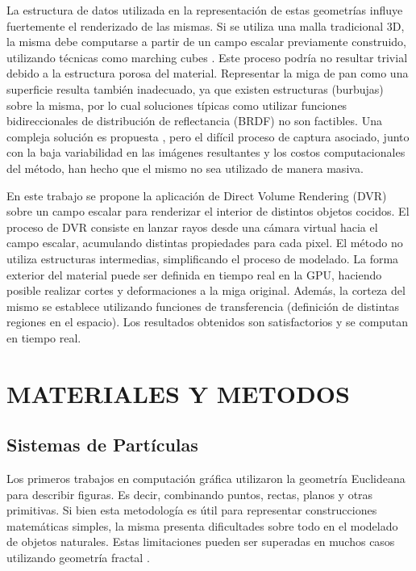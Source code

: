 \documentclass[oneside,a4paper,spanish,links]{amca}
\begin{document}
La estructura de datos utilizada en la representaci\'on de estas geometr\'ias influye fuertemente el renderizado de las mismas. Si se utiliza una malla tradicional 3D, la misma debe computarse a partir de un campo escalar previamente construido, utilizando t\'ecnicas como 
marching cubes \citep{Lorensen1987}. Este proceso podr\'ia no resultar trivial debido a la estructura porosa del material. Representar la miga de pan como una superficie resulta tambi\'en inadecuado, ya que existen estructuras (burbujas) sobre la misma, por lo cual soluciones t\'ipicas como utilizar funciones bidireccionales de distribuci\'on de reflectancia (BRDF) \citep{Kurt2009} no son factibles. Una compleja soluci\'on es propuesta \citep{Tong2005}, pero el dif\'icil proceso de captura asociado, junto con la baja variabilidad en las im\'agenes resultantes y los costos computacionales del m\'etodo, han hecho que el mismo no sea utilizado de manera masiva. 

En este trabajo se propone la aplicaci\'on de Direct Volume Rendering (DVR) \citep{Levoy1988, Kratz2006} sobre un campo escalar para renderizar el interior de distintos objetos cocidos. El proceso de DVR consiste en lanzar rayos desde una c\'amara virtual hacia el campo escalar, acumulando distintas propiedades para cada pixel. El m\'etodo no utiliza estructuras intermedias, simplificando el proceso de modelado. La forma exterior del material puede ser definida en tiempo real en la GPU, haciendo posible realizar cortes y deformaciones a la miga original. Adem\'as, la corteza del mismo se establece utilizando funciones de transferencia (definici\'on de distintas regiones en el espacio). Los resultados obtenidos son satisfactorios y se computan en tiempo real.

\section{MATERIALES Y METODOS}

\subsection{Sistemas de Part\'iculas}

Los primeros trabajos en computaci\'on gr\'afica utilizaron la geometr\'ia Euclideana para describir figuras. Es decir, combinando puntos, rectas, planos y otras primitivas. Si bien esta metodolog\'ia es \'util para representar construcciones matem\'aticas simples, la misma presenta dificultades sobre todo en el modelado de objetos naturales. Estas limitaciones pueden ser superadas en muchos casos utilizando geometría fractal \citep{Mandelbrot83}.
\end{document}
